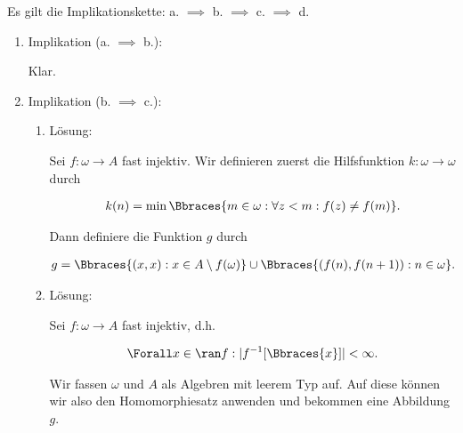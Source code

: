\begin{solution}

Es gilt die Implikationskette: a. $\implies$ b. $\implies$ c. $\implies$ d.

\begin{enumerate}[label = \arabic*.]

  \item Implikation (a. $\implies$ b.):
  
  Klar.

  \item Implikation (b. $\implies$ c.):
  
  \begin{enumerate}[label = \arabic*.]

    \item Lösung:

    Sei $f: \omega \to A$ fast injektiv.
    Wir definieren zuerst die Hilfsfunktion $k: \omega \to \omega$ durch
  
    \begin{align*}
      k(n) = \min \Bbraces{m \in \omega: \forall z < m: f(z) \neq f(m)}.
    \end{align*}
  
    Dann definiere die Funktion $g$ durch
  
    \begin{align*}
      g = \Bbraces{(x, x): x \in A \setminus f(\omega)} \cup \Bbraces{(f(n), f(n+1)): n \in \omega}.
    \end{align*}

    \item Lösung:
    
    Sei $f: \omega \to A$ fast injektiv, d.h.

    \begin{align*}
      \Forall x \in \ran f:
      |f^{-1}[\Bbraces{x}]| < \infty.
    \end{align*}

    Wir fassen $\omega$ und $A$ als Algebren mit leerem Typ auf.
    Auf diese können wir also den Homomorphiesatz anwenden und bekommen eine Abbildung $g$.

    \phantom{}



\end{enumerate}
\end{enumerate}
\end{solution}
